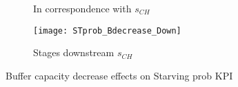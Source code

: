 \begin{landscape}
\begin{figure}[p]
\begin{subfigure}[b]{0.4\textwidth}
    \caption{In correspondence with $s_{CH}$}
    \label{fig:Buffer capacity decrease effects on Starving prob KPI - In correspondence with}   
  \end{subfigure}
  \begin{subfigure}[b]{0.4\textwidth}
    \texttt{[image: STprob\_Bdecrease\_Down]}
    \caption{Stages downstream $s_{CH}$}
    \label{fig:Buffer capacity decrease effects on Starving prob KPI - Stages downstream}   
  \end{subfigure}
  \caption{Buffer capacity decrease effects on Starving prob KPI}
  \label{fig:Buffer capacity decrease effects on Starving prob KPI}
\end{figure}
\end{landscape}
